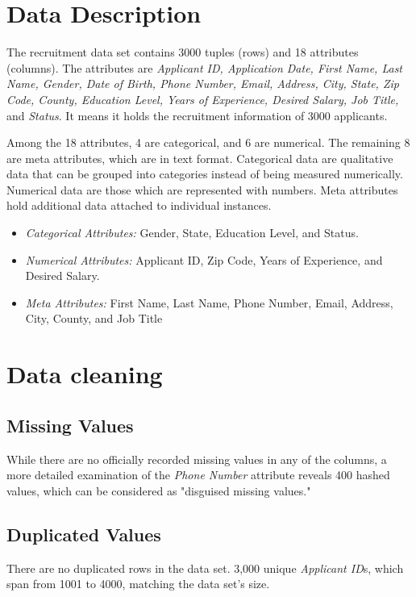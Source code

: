 \documentclass[journal]{IEEEtai}
\begin{document}
\section{Data Description}
The recruitment data set contains 3000 tuples (rows) and 18 attributes (columns). The attributes are {\it Applicant ID, Application Date, First Name, Last Name, Gender, Date of Birth, Phone Number, Email, Address, City, State, Zip Code, County, Education Level, Years of Experience, Desired Salary, Job Title,} and {\it Status}. It means it holds the recruitment information of 3000 applicants. 

Among the 18 attributes, 4 are categorical, and 6 are numerical. The remaining 8 are meta attributes, which are in text format. Categorical data are qualitative data that can be grouped into categories instead of being measured numerically. Numerical data are those which are represented with numbers. Meta attributes hold additional data attached to individual instances. 


\begin{itemize}
  \item  {\it Categorical Attributes:}  Gender, State, Education Level, and Status.
  \item  {\it Numerical Attributes:} Applicant ID, Zip Code, Years of Experience, and Desired Salary.
  \item  {\it Meta Attributes:} First Name, Last Name, Phone Number, Email, Address, City, County, and Job Title
\end{itemize}




\section{Data cleaning}
\subsection{Missing Values}
While there are no officially recorded missing values in any of the columns, a more detailed examination of the {\it Phone Number} attribute reveals 400 hashed values, which can be considered as "disguised missing values."

\subsection{Duplicated Values}
There are no duplicated rows in the data set. 3,000 unique {\it Applicant ID}s, which span from 1001 to 4000, matching the data set's size.
\end{document}
